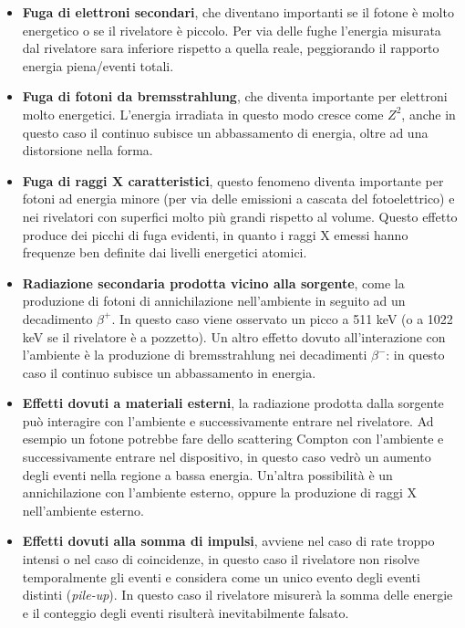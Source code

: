 \begin{itemize}
\item \textbf{Fuga di elettroni secondari}, che diventano importanti se il fotone \`e molto energetico o se il rivelatore \`e piccolo. Per via delle fughe l'energia misurata
	dal rivelatore sara inferiore rispetto a quella reale, peggiorando il rapporto energia piena/eventi totali.
\item \textbf{Fuga di fotoni da bremsstrahlung}, che diventa importante per elettroni molto energetici. L'energia irradiata in questo modo cresce come $Z^2$, anche in questo
	caso il continuo subisce un abbassamento di energia, oltre ad una distorsione nella forma.
\item \textbf{Fuga di raggi X caratteristici}, questo fenomeno diventa importante per fotoni ad energia minore (per via delle emissioni a cascata del fotoelettrico) e nei rivelatori con superfici
	molto pi\`u grandi rispetto al volume.
	Questo effetto produce dei picchi di fuga evidenti, in quanto i raggi X emessi hanno frequenze ben definite dai livelli energetici atomici.
\item \textbf{Radiazione secondaria prodotta vicino alla sorgente}, come la produzione di fotoni di annichilazione nell'ambiente in seguito ad un decadimento $\beta^+$.
	In questo caso viene osservato un picco a 511 keV (o a 1022 keV se il rivelatore \`e a pozzetto).
	Un altro effetto dovuto all'interazione con l'ambiente \`e la produzione di bremsstrahlung nei decadimenti $\beta^-$: in questo caso il continuo subisce un abbassamento in energia.
\item \textbf{Effetti dovuti a materiali esterni}, la radiazione prodotta dalla sorgente pu\`o interagire con l'ambiente e successivamente entrare nel rivelatore.
	Ad esempio un fotone potrebbe fare dello scattering Compton con l'ambiente e successivamente entrare nel dispositivo, in questo caso vedr\`o un aumento degli eventi nella
	regione a bassa energia. Un'altra possibilit\`a \`e un annichilazione con l'ambiente esterno, oppure la produzione di raggi X nell'ambiente esterno.
\item \textbf{Effetti dovuti alla somma di impulsi}, avviene nel caso di rate troppo intensi o nel caso di coincidenze, in questo caso il rivelatore non risolve
	temporalmente gli eventi e considera come un unico evento degli eventi distinti (\textit{pile-up}).
	In questo caso il rivelatore misurer\`a la somma delle energie e il conteggio degli eventi risulter\`a inevitabilmente falsato.
\end{itemize}

